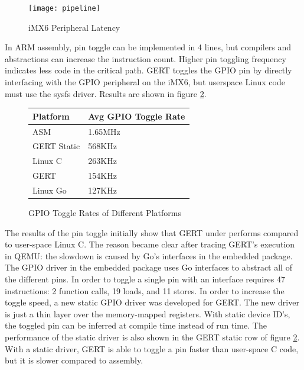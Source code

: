 \begin{figure}[h]
\begin{center}
  \texttt{[image: pipeline]}
\end{center}
  \caption{iMX6 Peripheral Latency} \label{fig:pipeline}
\end{figure}

In ARM assembly, pin toggle can be implemented in 4 lines, but compilers and 
abstractions can increase the instruction count. Higher pin
toggling frequency indicates less code in the critical path.
GERT toggles the GPIO pin by directly interfacing with the GPIO
peripheral on the iMX6, but userspace Linux code must use the
sysfs driver.
Results are shown in figure \ref{fig:toggle}.


\begin{figure} [h]
\begin{center}
  \begin{tabular}{ | l | l |}
    \hline
    Platform & Avg GPIO Toggle Rate \\ \hline
    ASM & 1.65MHz \\ \hline
    GERT Static & 568KHz \\ \hline
    Linux C & 263KHz \\ \hline
    GERT & 154KHz \\ \hline
    Linux Go & 127KHz \\
    \hline
  \end{tabular}
\end{center}
  \caption{GPIO Toggle Rates of Different Platforms}  \label{fig:toggle}
\end{figure}


The results of the pin toggle initially show that GERT under performs compared to
user-space Linux C. The reason became clear after tracing GERT's execution in QEMU:
the slowdown is caused by Go's interfaces in the embedded package. The GPIO driver
in the embedded package uses Go interfaces to abstract all of the different pins.
In order to toggle a single pin with an interface requires 47 instructions:
2 function calls, 19 loads, and 11 stores. In order to increase the toggle speed,
a new static GPIO driver was developed for GERT. The new driver is just a thin layer
over the memory-mapped registers. With static device ID's, the toggled pin
can be inferred at compile time instead of run time.
The performance of the static driver is also shown in the GERT static row
of figure \ref{fig:toggle}. With a static driver, GERT is able to toggle a
pin faster than user-space C code, but it is slower compared to
assembly.

